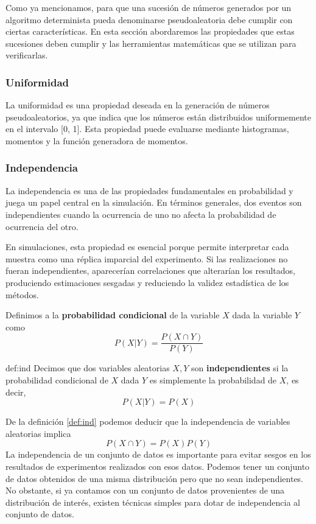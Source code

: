 \documentclass[../Main.tex]{subfiles}
\begin{document}
Como ya mencionamos, para que una sucesión de números generados por un algoritmo determinista pueda denominarse pseudoaleatoria debe cumplir con ciertas características. En esta sección abordaremos las propiedades que estas sucesiones deben cumplir y las herramientas matemáticas que se utilizan para verificarlas. 
\subsubsection{Uniformidad}
La uniformidad es una propiedad deseada en la generación de números pseudoaleatorios, ya que indica que los números están distribuidos uniformemente en el intervalo [0, 1]. Esta propiedad puede evaluarse mediante histogramas, momentos y la función generadora de momentos.

\subsubsection{Independencia}

La independencia es una de las propiedades fundamentales en probabilidad y juega un papel central en la simulación. En términos generales, dos eventos son independientes cuando la ocurrencia de uno no afecta la probabilidad de ocurrencia del otro.  

En simulaciones, esta propiedad es esencial porque permite interpretar cada muestra como una réplica imparcial del experimento. Si las realizaciones no fueran independientes, aparecerían correlaciones que alterarían los resultados, produciendo estimaciones sesgadas y reduciendo la validez estadística de los métodos.  

\begin{definition}{}{}
    Definimos a la \textbf{probabilidad condicional} de la variable $X$ dada la variable $Y$ como \[P(X|Y)=\frac{P(X\cap Y)}{P(Y)}\]
\end{definition}
\begin{definition}{}{def:ind}
    Decimos que dos variables aleatorias $X,Y$ son \textbf{independientes} si la probabilidad condicional de $X$ dada $Y$ es simplemente la probabilidad de $X$, es decir, \[P(X|Y)=P(X)\]
\end{definition}

De la definición \ref{def:ind} podemos deducir que la independencia de variables aleatorias implica \[P(X\cap Y)=P(X)P(Y)\]
La independencia de un conjunto de datos es importante para evitar sesgos en los resultados de experimentos realizados con esos datos. Podemos tener un conjunto de datos obtenidos de una misma distribución pero que no sean independientes. No obstante, si ya contamos con un conjunto de datos provenientes de una distribución de interés, existen técnicas simples para dotar de independencia al conjunto de datos. 
\end{document}
